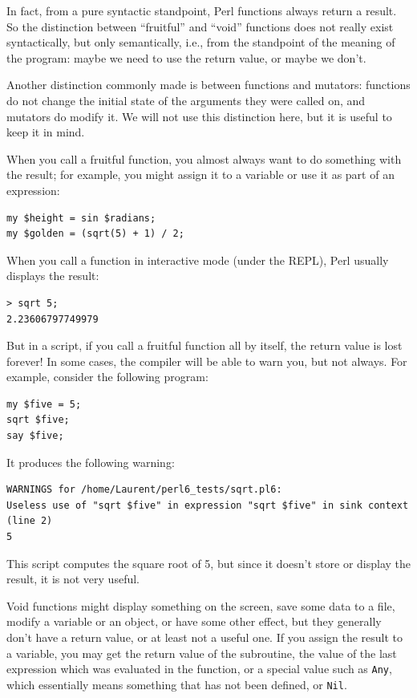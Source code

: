 In fact, from a pure syntactic standpoint, Perl functions 
always return a result. So the distinction between 
``fruitful'' and ``void'' functions does not really exist 
syntactically, but only semantically, i.e., from the 
standpoint of the meaning of the program: maybe we need to 
use the return value, or maybe we don't.

Another distinction commonly made is between functions and 
mutators: functions do not change the initial state of the 
arguments they were called on, and mutators do modify it. We 
will not use this distinction here, but it is useful to 
keep it in mind.

When you call a fruitful function, you almost always
want to do something with the result; for example, you might
assign it to a variable or use it as part of an expression:

\begin{verbatim}
my $height = sin $radians;
my $golden = (sqrt(5) + 1) / 2;
\end{verbatim}
%
When you call a function in interactive mode (under the 
REPL), Perl usually displays the result:

\begin{verbatim}
> sqrt 5;
2.23606797749979
\end{verbatim}
%
But in a script, if you call a fruitful function all by 
itself, the return value is lost forever! In some cases, the 
compiler will be able to warn you, but not always. For example, 
consider the following program:

\begin{verbatim}
my $five = 5;
sqrt $five;
say $five;
\end{verbatim}

It produces the following warning:

\begin{verbatim}
WARNINGS for /home/Laurent/perl6_tests/sqrt.pl6:
Useless use of "sqrt $five" in expression "sqrt $five" in sink context (line 2)
5
\end{verbatim}
%
This script computes the square root of 5, but since 
it doesn't store or display the result, it is not very useful.

Void functions might display something on the screen, 
save some data to a file, modify a variable or an object, 
or have some other effect, but they generally don't have 
a return value, or at least not a useful one.  If you assign 
the result to a variable, you may get the return value of 
the subroutine, the value of the last expression which was 
evaluated in the function, or a special value such as 
{\tt Any}, which essentially means something that has not 
been defined, or {\tt Nil}.
%

